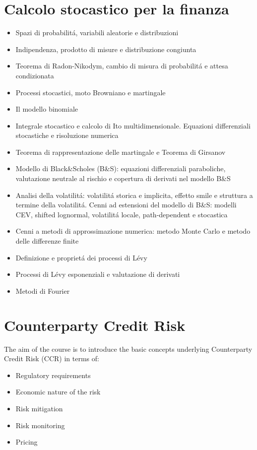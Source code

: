 \documentclass[a4paper,10pt]{article}
\begin{document}
\section{Calcolo stocastico per la finanza}
\begin{itemize}
	\item Spazi di probabilit\'{a}, variabili aleatorie e distribuzioni
	\item Indipendenza, prodotto di misure e distribuzione congiunta
	\item Teorema di Radon-Nikodym, cambio di misura di probabilit\'{a} e attesa condizionata
	\item Processi stocastici, moto Browniano e martingale
	\item Il modello binomiale
	\item Integrale stocastico e calcolo di Ito multidimensionale. Equazioni differenziali stocastiche e risoluzione numerica
	\item Teorema di rappresentazione delle martingale e Teorema di Girsanov
	\item Modello di Black\&Scholes (B\&S): equazioni differenziali paraboliche, valutazione neutrale al rischio e copertura di derivati nel modello B\&S
	\item Analisi della volatilit\'{a}: volatilit\'{a} storica e implicita, effetto smile e struttura a termine della volatilit\'{a}. Cenni ad estensioni del modello di B\&S: modelli CEV, shifted lognormal, volatilit\'{a} locale, path-dependent e stocastica
	\item Cenni a metodi di approssimazione numerica: metodo Monte Carlo e metodo delle differenze finite
	\item Definizione e propriet\'{a} dei processi di L\'{e}vy
	\item Processi di L\'{e}vy esponenziali e valutazione di derivati
	\item Metodi di Fourier
\end{itemize}

\section{Counterparty Credit Risk}
The aim of the course is to introduce the basic concepts underlying Counterparty Credit Risk (CCR) in terms of:

\begin{itemize}
	\item Regulatory requirements
	\item Economic nature of the risk
	\item Risk mitigation
	\item Risk monitoring
	\item Pricing
\end{itemize}
\end{document}
